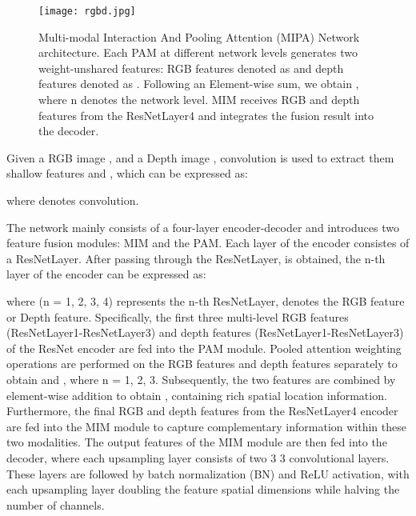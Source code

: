 \documentclass{aims}
\numberwithin{equation}{section}
\begin{document}
\begin{figure}[t]
\centering
\texttt{[image: rgbd.jpg]}
\caption{Multi-modal Interaction And Pooling Attention (MIPA) Network architecture. Each PAM at different network levels generates two weight-unshared features: RGB features denoted as  and depth features denoted as . Following an Element-wise sum, we obtain , where n denotes the network level. MIM receives RGB and depth features from the ResNetLayer4 and integrates the fusion result  into the decoder.\label{fig:net}}
\end{figure}  

Given a RGB image , and a Depth image ,  convolution is used to extract them shallow features  and , which can be expressed as:



where  denotes  convolution.

The network mainly consists of a four-layer encoder-decoder and introduces two feature fusion modules: MIM and the PAM. Each layer of the encoder consistes of a ResNetLayer. After  passing through the ResNetLayer,  is obtained, the n-th layer of the encoder can be expressed as:

where  (n = 1, 2, 3, 4) represents the n-th ResNetLayer,  denotes the RGB feature or Depth feature. Specifically, the first three multi-level RGB features (ResNetLayer1-ResNetLayer3) and depth features (ResNetLayer1-ResNetLayer3) of the ResNet encoder are fed into the PAM module. Pooled attention weighting operations are performed on the RGB features and depth features separately to obtain  and , where n = 1, 2, 3. Subsequently, the two features are combined by element-wise addition to obtain , containing rich spatial location information. Furthermore, the final RGB and depth features from the ResNetLayer4 encoder are fed into the MIM module to capture complementary information within these two modalities. The output features of the MIM module are then fed into the decoder, where each upsampling layer consists of two 3  3 convolutional layers. These layers are followed by batch normalization (BN) and ReLU activation, with each upsampling layer doubling the feature spatial dimensions while halving the number of channels.
\end{document}
